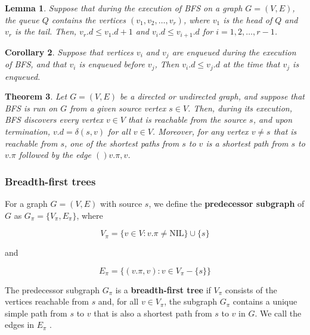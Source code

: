 \documentclass[12pt]{article}
\newtheorem{theorem}{Theorem}
\newtheorem{lemma}[theorem]{Lemma}
\newtheorem{corollary}[theorem]{Corollary}
\begin{document}
\begin{lemma}
  Suppose that during the execution of BFS on a graph $G = (V,E)$, the queue $Q$ contains the vertices $(v_1, v_2, \dots, v_r)$, where $v_1$ is the head of $Q$ and $v_r$ is the tail. Then, $v_r.d \le v_1.d + 1$ and $v_i.d \le v_{i+1}.d$ for $i = 1, 2, \dots, r-1$.
\end{lemma}

\begin{corollary}
  Suppose that vertices $v_i$ and $v_j$ are enqueued during the execution of BFS, and that $v_i$ is enqueued before $v_j$, Then $v_i.d \le v_j.d$ at the time that $v_j$ is enqueued.
\end{corollary}

\begin{theorem}
  Let $G = (V,E)$ be a directed or undirected graph, and suppose that BFS is run on $G$ from a given source vertex $s \in V$. Then, during its execution, BFS discovers every vertex $v \in V$ that is reachable from the source $s$, and upon termination, $v.d = \delta (s,v)$ for all $v \in V$. Moreover, for any vertex $v \neq s$ that is reachable from $s$, one of the shortest paths from $s$ to $v$ is a shortest path from $s$ to $v.\pi$ followed by the edge $()v.\pi, v$.
\end{theorem}

\subsubsection*{Breadth-first trees}

For a graph $G = (V,E)$ with source $s$, we define the \textbf{predecessor subgraph} of $G$ as $G_{\pi} = \{ V_{\pi}, E_{\pi} \}$, where

\begin{equation*}
  V_{\pi} = \{ v \in V : v.\pi \neq \text{NIL} \} \cup \{ s \}
\end{equation*}

and

\begin{equation*}
  E_{\pi} = \{ (v.\pi, v) : v \in V_{\pi} - \{ s \} \} 
\end{equation*}

The predecessor subgraph $G_{\pi}$ is a \textbf{breadth-first tree} if $V_{\pi}$ consists of the vertices reachable from $s$ and, for all $v \in V_{\pi}$, the subgraph $G_{\pi}$ contains a unique simple path from $s$ to $v$ that is also a shortest path from $s$ to $v$ in $G$. We call the edges in $E_{\pi}$ .
\end{document}
